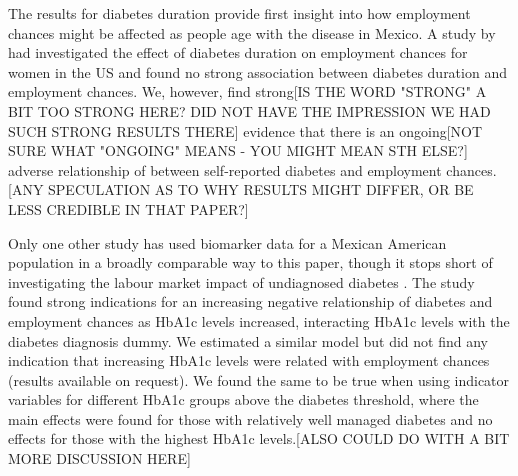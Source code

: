 The results for diabetes duration provide first insight into how employment
chances might be affected as people age with the disease in Mexico.
A study by \citet{Minor2013} had investigated the effect of diabetes
duration on employment chances for women in the US and found no strong
association between diabetes duration and employment chances. We,
however, find strong[IS THE WORD "STRONG" A BIT TOO STRONG HERE? DID NOT HAVE THE IMPRESSION WE HAD SUCH STRONG RESULTS THERE] evidence that there is an ongoing[NOT SURE WHAT "ONGOING" MEANS - YOU MIGHT MEAN STH ELSE?] adverse relationship
of between self-reported diabetes and employment chances. [ANY SPECULATION AS TO WHY RESULTS MIGHT DIFFER, OR BE LESS CREDIBLE IN THAT PAPER?] 

Only one other study has used biomarker data for a Mexican American
population in a broadly comparable way to this paper, though it stops short of investigating
the labour market impact of undiagnosed diabetes \citep{BrownIII2011}. The study found strong indications
for an increasing negative relationship of diabetes and employment
chances as \ac{HbA1c} levels increased, interacting \ac{HbA1c} levels
with the diabetes diagnosis dummy. We estimated a similar model but
did not find any indication that increasing \ac{HbA1c} levels were
related with employment chances (results available on request). We
found the same to be true when using indicator variables for different
\ac{HbA1c} groups above the diabetes threshold, where the main effects
were found for those with relatively well managed diabetes and no
effects for those with the highest \ac{HbA1c} levels.[ALSO COULD DO WITH A BIT MORE DISCUSSION HERE]

